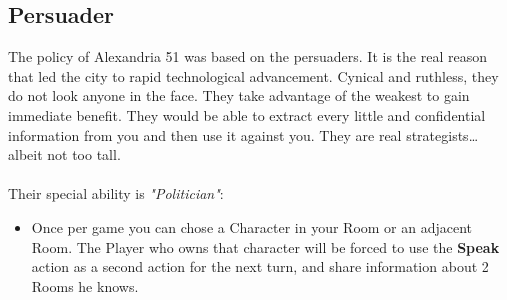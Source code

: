 \subsection{Persuader}


The policy of Alexandria 51 was based on the persuaders. It is the real reason that led the city to rapid technological advancement. Cynical and ruthless, they do not look anyone in the face. They take advantage of the weakest to gain immediate benefit. They would be able to extract every little and confidential information from you and then use it against you. They are real strategists… albeit not too tall.\\\\
Their special ability is \textit{"Politician"}:
\begin{itemize}
\item Once per game you can chose a Character in your Room or an adjacent Room. The Player who owns that character will be forced to use the \textbf{Speak} action as a second action for the next turn, and share information about 2 Rooms he knows.
\end{itemize}
